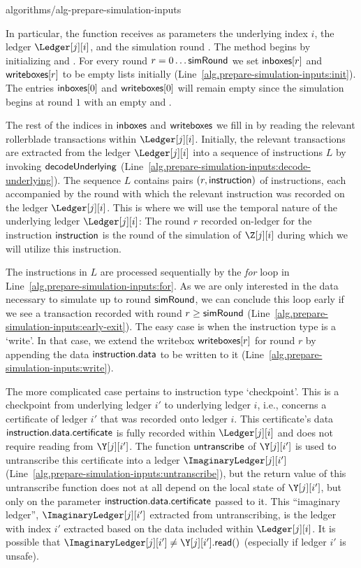 {algorithms/alg-prepare-simulation-inputs}

In particular, the function \prepareSimulationInputs receives as parameters
the underlying index $i$, the ledger $\Ledger[j][i]$,
and the simulation round \simulationRound.
The method begins by initializing \inboxes and \writeboxes. For every round $r = 0 \ldots \textsf{simRound}$ we set
$\textsf{inboxes}[r]$ and $\textsf{writeboxes}[r]$ to be empty lists initially (Line~\ref{alg.prepare-simulation-inputs:init}).
The entries $\textsf{inboxes}[0]$ and $\textsf{writeboxes}[0]$ will remain empty
since the simulation begins at round $1$ with an empty \inbox and \writebox.

The rest of the indices in $\textsf{inboxes}$
and $\textsf{writeboxes}$ we fill in by reading the relevant rollerblade transactions within $\Ledger[j][i]$.
Initially, the relevant transactions are extracted from the ledger $\Ledger[j][i]$ into a sequence
of instructions $L$ by invoking $\textsf{decodeUnderlying}$ (Line~\ref{alg.prepare-simulation-inputs:decode-underlying}).
The sequence $L$ contains pairs $(r, \textsf{instruction})$ of instructions, each accompanied by the round with which
the relevant instruction was recorded on the ledger $\Ledger[j][i]$. This is where we will use the temporal
nature of the underlying ledger $\Ledger[j][i]$: The round $r$ recorded on-ledger for the instruction
$\textsf{instruction}$ is the round of the simulation of $\Z[j][i]$ during which we will utilize this instruction.

The instructions in $L$ are processed sequentially by the \emph{for} loop in Line~\ref{alg.prepare-simulation-inputs:for}.
As we are only interested in the data necessary to simulate up to round $\textsf{simRound}$, we can conclude this loop
early if we see a transaction recorded with round $r \geq \textsf{simRound}$ (Line~\ref{alg.prepare-simulation-inputs:early-exit}).
The easy case is when the instruction type is a `write'. In that case, we extend the writebox $\textsf{writeboxes}[r]$
for round $r$ by appending the data $\textsf{instruction}.\textsf{data}$ to be written to it (Line~\ref{alg.prepare-simulation-inputs:write}).

The more complicated case pertains to instruction type `checkpoint'. This is a checkpoint from underlying
ledger $i'$ to underlying ledger $i$, i.e., concerns a certificate of ledger $i'$ that was recorded onto
ledger $i$. This certificate's data $\textsf{instruction}.\textsf{data}.\textsf{certificate}$ is fully recorded within $\Ledger[j][i]$
and does not require reading from $\Y[j][i']$. The function $\textsf{untranscribe}$ of $\Y[j][i']$ is used to untranscribe
this certificate into a ledger $\ImaginaryLedger[j][i']$ (Line~\ref{alg.prepare-simulation-inputs:untranscribe}),
but the return value of this untranscribe function does not at all depend on the local state of $\Y[j][i']$,
but only on the parameter $\textsf{instruction}.\textsf{data}.\textsf{certificate}$ passed to it. This ``imaginary ledger'',
$\ImaginaryLedger[j][i']$ extracted from untranscribing, is the ledger with index $i'$ extracted
based on the data included within $\Ledger[j][i]$. It is possible that
$\ImaginaryLedger[j][i'] \neq \Y[j][i'].\lread()$ (especially if ledger $i'$ is unsafe).


